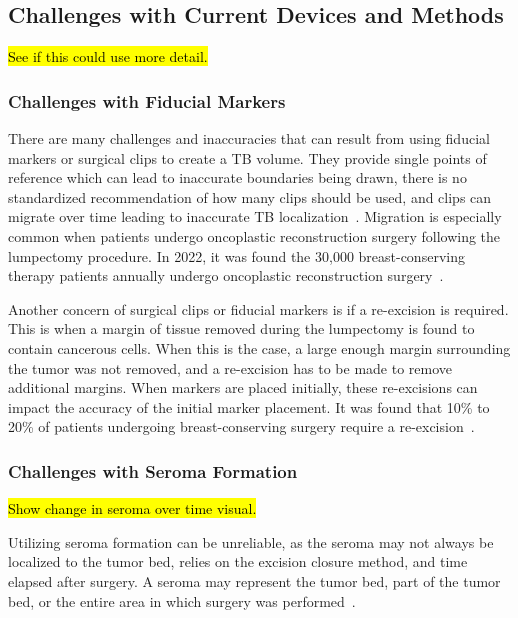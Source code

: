 \subsection{Challenges with Current Devices and Methods\label{sec:literatureReview:currentMethods:challengeswithcurrentdevicesandmethods}}

\hl{See if this could use more detail.}
\subsubsection{Challenges with Fiducial Markers\label{sec:literatureReview:currentMethods:challengeswithcurrentdevicesandmethods:fiducialMarkers}}
There are many challenges and inaccuracies that can result from using fiducial markers or surgical clips to create a TB volume. They provide single points of reference which can lead to inaccurate boundaries being drawn, there is no standardized recommendation of how many clips should be used, and clips can migrate over time leading to inaccurate TB localization~\cite{RefWorks:RefID:344-mitchell2019adaptable}. Migration is especially common when patients undergo oncoplastic reconstruction surgery following the lumpectomy procedure. In 2022, it was found the 30,000 breast-conserving therapy patients annually undergo oncoplastic reconstruction surgery~\cite{RefWorks:RefID:25-acree2022review}.

Another concern of surgical clips or fiducial markers is if a re-excision is required. This is when a margin of tissue removed during the lumpectomy is found to contain cancerous cells. When this is the case, a large enough margin surrounding the tumor was not removed, and a re-excision has to be made to remove additional margins. When markers are placed initially, these re-excisions can impact the accuracy of the initial marker placement. It was found that 10\% to 20\% of patients undergoing breast-conserving surgery require a re-excision~\cite{RefWorks:RefID:25-acree2022review}.

\subsubsection{Challenges with Seroma Formation\label{sec:literatureReview:currentMethods:challengeswithcurrentdevicesandmethods:seroma}}
\hl{Show change in seroma over time visual.\\}

Utilizing seroma formation can be unreliable, as the seroma may not always be localized to the tumor bed, relies on the excision closure method, and time elapsed after surgery\cite{RefWorks:RefID:25-acree2022review}. A seroma may represent the tumor bed, part of the tumor bed, or the entire area in which surgery was performed~\cite{RefWorks:RefID:344-mitchell2019adaptable}.


